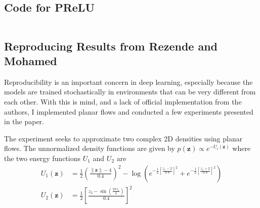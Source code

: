 \documentclass[runningheads]{llncs}
\newenvironment{code}{\captionsetup{type=listing}}{}
\begin{document}
\subsection{Code for PReLU}
\begin{code}
	\inputminted[linenos=true,frame=lines,framesep=2mm]{python}{prelu.py}
\end{code}

\subsection{Reproducing Results from Rezende and Mohamed~\cite{rezende2015variational}}
Reproducibility is an important concern in deep learning, especially because the models are trained stochastically in environments that can be very different from each other.  With this is mind, and a lack of official implementation from the authors, I implemented planar flows and conducted a few experiments presented in the paper. 

The experiment seeks to approximate two complex 2D densities using planar flows. The unnormalized density functions are given by $p(\mathbf{z}) \propto e^{-U_i(\mathbf{z})}$ where the two energy functions $U_1$ and $U_2$ are
\begin{align}
U_1(\mathbf{z}) &= \frac{1}{2}\left(\frac{\|\mathbf{z}\| - 4}{0.4}\right)^2 - \log \left(e^{-\frac{1}{2}\left[\frac{z_1-2}{0.8}\right]^2} + e^{-\frac{1}{2}\left[\frac{z_1+2}{0.8}\right]^2} \right)\\
U_2(\mathbf{z}) &= \frac{1}{2}\left[\frac{z_2 - \sin\left(\frac{2\pi z_1}{4}\right)}{0.4}\right]^2
\end{align}
\end{document}
